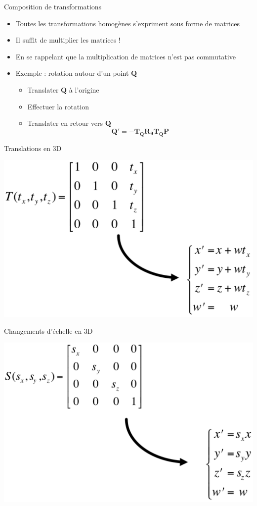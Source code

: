 \begin{frame}{Composition de transformations}
\begin{itemize}
\item Toutes les transformations homogènes s'expriment sous forme de matrices
\item Il suffit de multiplier les matrices !
\item En se rappelant que la multiplication de matrices n'est pas commutative
\item Exemple : rotation autour d'un point $\mathbf{Q}$
\begin{itemize}
\item Translater $\mathbf{Q}$ à l'origine
\item Effectuer la rotation
\item Translater en retour vers $\mathbf{Q}$
$$
\mathbf{Q'} = -\mathbf{T_Q R_{\theta} T_Q P}
$$
\end{itemize}
\end{itemize}
\end{frame}


\begin{frame}{Translations en 3D}
\begin{center}
\includegraphics[width=.8\textwidth]{figs/transh3.png}
\end{center}
\end{frame}

\begin{frame}{Changements d'échelle en 3D}
\begin{center}
\includegraphics[width=.8\textwidth]{figs/scaleh3.png}
\end{center}
\end{frame}

